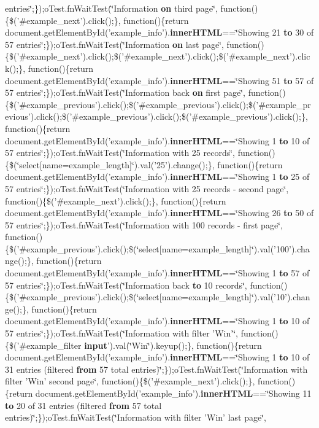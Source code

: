 {{\begin{DoxyParamCaption}
entries\char`\"{};\});o\+Test.\+fn\+Wait\+Test(\char`\"{}Information {\bf on} third page\char`\"{}, function()\{\$('\#example\+\_\+next').click();\}, function()\{return document.\+get\+Element\+By\+Id('example\+\_\+info').{\bf inner\+H\+T\+M\+L}==\char`\"{}Showing 21 {\bf to} 30 of 57 entries\char`\"{};\});o\+Test.\+fn\+Wait\+Test(\char`\"{}Information {\bf on} last page\char`\"{}, function()\{\$('\#example\+\_\+next').click();\$('\#example\+\_\+next').click();\$('\#example\+\_\+next').click();\}, function()\{return document.\+get\+Element\+By\+Id('example\+\_\+info').{\bf inner\+H\+T\+M\+L}==\char`\"{}Showing 51 {\bf to} 57 of 57 entries\char`\"{};\});o\+Test.\+fn\+Wait\+Test(\char`\"{}Information back {\bf on} first page\char`\"{}, function()\{\$('\#example\+\_\+previous').click();\$('\#example\+\_\+previous').click();\$('\#example\+\_\+previous').click();\$('\#example\+\_\+previous').click();\$('\#example\+\_\+previous').click();\}, function()\{return document.\+get\+Element\+By\+Id('example\+\_\+info').{\bf inner\+H\+T\+M\+L}==\char`\"{}Showing 1 {\bf to} 10 of 57 entries\char`\"{};\});o\+Test.\+fn\+Wait\+Test(\char`\"{}Information with 25 records\char`\"{}, function()\{\$(\char`\"{}select\mbox{[}name=example\+\_\+length\mbox{]}\char`\"{}).val('25').change();\}, function()\{return document.\+get\+Element\+By\+Id('example\+\_\+info').{\bf inner\+H\+T\+M\+L}==\char`\"{}Showing 1 {\bf to} 25 of 57 entries\char`\"{};\});o\+Test.\+fn\+Wait\+Test(\char`\"{}Information with 25 records -\/ second page\char`\"{}, function()\{\$('\#example\+\_\+next').click();\}, function()\{return document.\+get\+Element\+By\+Id('example\+\_\+info').{\bf inner\+H\+T\+M\+L}==\char`\"{}Showing 26 {\bf to} 50 of 57 entries\char`\"{};\});o\+Test.\+fn\+Wait\+Test(\char`\"{}Information with 100 records -\/ first page\char`\"{}, function()\{\$('\#example\+\_\+previous').click();\$(\char`\"{}select\mbox{[}name=example\+\_\+length\mbox{]}\char`\"{}).val('100').change();\}, function()\{return document.\+get\+Element\+By\+Id('example\+\_\+info').{\bf inner\+H\+T\+M\+L}==\char`\"{}Showing 1 {\bf to} 57 of 57 entries\char`\"{};\});o\+Test.\+fn\+Wait\+Test(\char`\"{}Information back {\bf to} 10 records\char`\"{}, function()\{\$('\#example\+\_\+previous').click();\$(\char`\"{}select\mbox{[}name=example\+\_\+length\mbox{]}\char`\"{}).val('10').change();\}, function()\{return document.\+get\+Element\+By\+Id('example\+\_\+info').{\bf inner\+H\+T\+M\+L}==\char`\"{}Showing 1 {\bf to} 10 of 57 entries\char`\"{};\});o\+Test.\+fn\+Wait\+Test(\char`\"{}Information with filter 'Win'\char`\"{}, function()\{\$('\#example\+\_\+filter {\bf input}').val(\char`\"{}Win\char`\"{}).keyup();\}, function()\{return document.\+get\+Element\+By\+Id('example\+\_\+info').{\bf inner\+H\+T\+M\+L}==\char`\"{}Showing 1 {\bf to} 10 of 31 entries (filtered {\bf from} 57 total entries)\char`\"{};\});o\+Test.\+fn\+Wait\+Test(\char`\"{}Information with filter 'Win' second page\char`\"{}, function()\{\$('\#example\+\_\+next').click();\}, function()\{return document.\+get\+Element\+By\+Id('example\+\_\+info').{\bf inner\+H\+T\+M\+L}==\char`\"{}Showing 11 {\bf to} 20 of 31 entries (filtered {\bf from} 57 total entries)\char`\"{};\});o\+Test.\+fn\+Wait\+Test(\char`\"{}Information with filter 'Win' last page\char`\"{}, 
\end{DoxyParamCaption}}}
